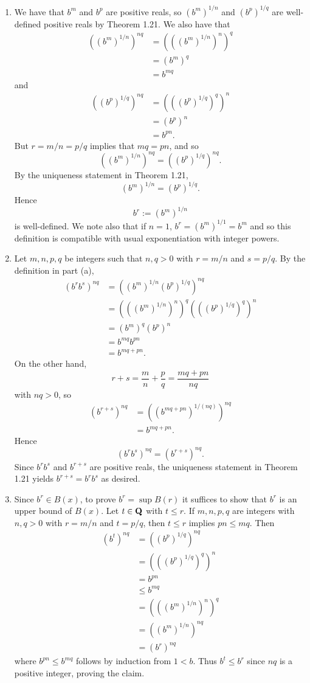 \begin{ex}
\begin{enumerate}
\item We have that $b^m$ and $b^p$ are positive reals, so $(b^m)^{1/n}$ and $(b^p)^{1/q}$ are well-defined positive reals by Theorem 1.21. We also have that
\begin{align*}
((b^m)^{1/n})^{nq} & = (((b^m)^{1/n})^n)^q\\
& = (b^m)^q\\
& = b^{mq}
\end{align*}
and
\begin{align*}
((b^p)^{1/q})^{nq} & = (((b^p)^{1/q})^q)^n\\
& = (b^p)^n\\
& = b^{pn}.
\end{align*}
But $r = m/n = p/q$ implies that $mq = pn$, and so \[((b^m)^{1/n})^{nq} = ((b^p)^{1/q})^{nq}.\] By the uniqueness statement in Theorem 1.21, \[(b^m)^{1/n} = (b^p)^{1/q}.\] Hence \[b^r := (b^m)^{1/n}\] is well-defined. We note also that if $n = 1$, $b^r = (b^m)^{1/1} = b^m$ and so this definition is compatible with usual exponentiation with integer powers.

\item Let $m, n, p, q$ be integers such that $n, q > 0$ with $r = m/n$ and $s = p/q$. By the definition in part (a),
\begin{align*}
(b^rb^s)^{nq} & = ((b^m)^{1/n}(b^p)^{1/q})^{nq}\\
& = (((b^m)^{1/n})^n)^q(((b^p)^{1/q})^q)^n\\
& = (b^m)^q(b^p)^n\\
& = b^{mq}b^{pn}\\
& = b^{mq + pn}.
\end{align*}
On the other hand, \[r + s = \frac{m}{n} + \frac{p}{q} = \frac{mq + pn}{nq}\] with $nq > 0$, so
\begin{align*}
(b^{r + s})^{nq} & = ((b^{mq + pn})^{1/(nq)})^{nq}\\
& = b^{mq + pn}.
\end{align*}
Hence \[(b^rb^s)^{nq} = (b^{r+s})^{nq}.\] Since $b^rb^s$ and $b^{r + s}$ are positive reals, the uniqueness statement in Theorem 1.21 yields $b^{r + s} = b^rb^s$ as desired.

\item Since $b^r \in B(x)$, to prove $b^r = \sup B(r)$ it suffices to show that $b^r$ is an upper bound of $B(x)$. Let $t \in \mathbf{Q}$ with $t \leq r$. If $m, n, p, q$ are integers with $n, q > 0$ with $r = m/n$ and $t = p/q$, then $t \leq r$ implies $pn \leq mq$. Then
\begin{align*}
(b^t)^{nq} & = ((b^p)^{1/q})^{nq}\\
& = (((b^p)^{1/q})^q)^n\\
& = b^{pn}\\
& \leq b^{mq}\\
& = (((b^m)^{1/n})^n)^q\\
& = ((b^m)^{1/n})^{nq}\\
& = (b^r)^{nq}
\end{align*}
where $b^{pn} \leq b^{mq}$ follows by induction from $1 < b$. Thus $b^t \leq b^r$ since $nq$ is a positive integer, proving the claim.


\end{enumerate}
\end{ex}

